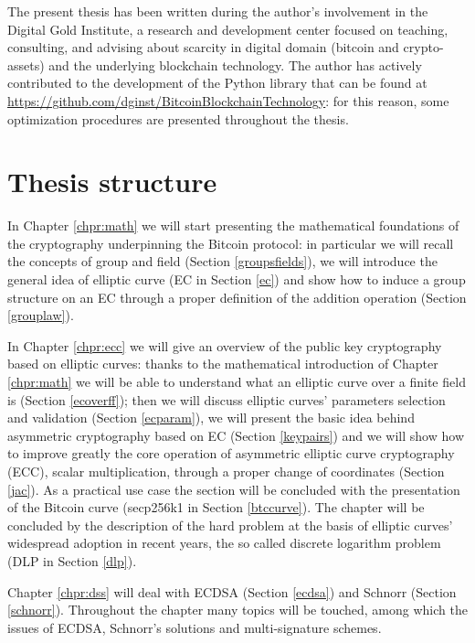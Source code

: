 \bigskip
\noindent
The present thesis has been written during the author's involvement in the Digital Gold Institute, a research and development center focused on teaching, consulting, and advising about scarcity in digital domain (bitcoin and crypto-assets) and the underlying blockchain technology. The author has actively contributed to the development of the Python library that can be found at \url{https://github.com/dginst/BitcoinBlockchainTechnology}: for this reason, some optimization procedures are presented throughout the thesis.

\bigskip

\bigskip

\section{Thesis structure}
In Chapter \ref{chpr:math} we will start presenting the mathematical foundations of the cryptography underpinning the Bitcoin protocol: in particular we will recall the concepts of group and field (Section \ref{groupsfields}), we will introduce the general idea of elliptic curve (EC in Section \ref{ec}) and show how to induce a group structure on an EC through a proper definition of the addition operation (Section \ref{grouplaw}).

\bigskip
\noindent
In Chapter \ref{chpr:ecc} we will give an overview of the public key cryptography based on elliptic curves: thanks to the mathematical introduction of Chapter \ref{chpr:math} we will be able to understand what an elliptic curve over a finite field is (Section \ref{ecoverff}); then we will discuss elliptic curves' parameters selection and validation (Section \ref{ecparam}), we will present the basic idea behind asymmetric cryptography based on EC (Section \ref{keypairs}) and we will show how to improve greatly the core operation of asymmetric elliptic curve cryptography (ECC), scalar multiplication, through a proper change of coordinates (Section \ref{jac}). As a practical use case the section will be concluded with the presentation of the Bitcoin curve (secp256k1 in Section \ref{btccurve}). The chapter will be concluded by the description of the hard problem at the basis of elliptic curves' widespread adoption in recent years, the so called discrete logarithm problem (DLP in Section \ref{dlp}).

\bigskip
\noindent
Chapter \ref{chpr:dss} will deal with ECDSA (Section \ref{ecdsa}) and Schnorr (Section \ref{schnorr}). Throughout the chapter many topics will be touched, among which the issues of ECDSA, Schnorr's solutions and multi-signature schemes.

